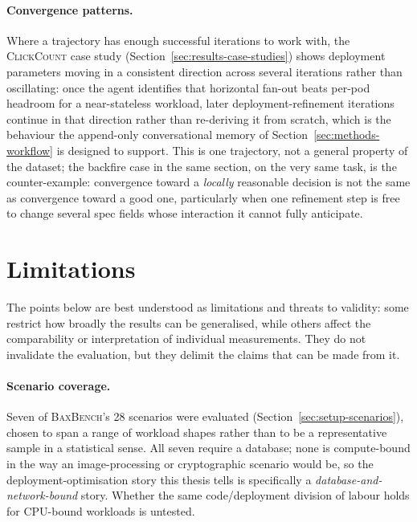 \paragraph{Convergence patterns.} Where a trajectory has enough successful
iterations to work with, the \textsc{ClickCount} case study
(Section~\ref{sec:results-case-studies}) shows deployment parameters
moving in a consistent direction across several iterations rather than
oscillating: once the agent identifies that horizontal fan-out beats
per-pod headroom for a near-stateless workload, later deployment-refinement iterations
continue in that direction rather than re-deriving it from scratch, which
is the behaviour the append-only conversational memory of
Section~\ref{sec:methods-workflow} is designed to support. This is one
trajectory, not a general property of the dataset; the backfire case in
the same section, on the very same task, is the counter-example:
convergence toward a \emph{locally} reasonable decision is not the same
as convergence toward a good one, particularly when one refinement step
is free to change several spec fields whose interaction it cannot fully
anticipate.


\section{Limitations}
\label{sec:discussion-limitations}

The points below are best understood as limitations and threats to validity:
some restrict how broadly the results can be generalised, while others affect
the comparability or interpretation of individual measurements. They do not
invalidate the evaluation, but they delimit the claims that can be made from
it.

\paragraph{Scenario coverage.} Seven of \textsc{BaxBench}'s 28 scenarios
were evaluated (Section~\ref{sec:setup-scenarios}), chosen to span a range
of workload shapes rather than to be a representative sample in a
statistical sense. All seven require a database; none is compute-bound in
the way an image-processing or cryptographic scenario would be, so the
deployment-optimisation story this thesis tells is specifically a
\emph{database-and-network-bound} story. Whether the same code/deployment
division of labour holds for CPU-bound workloads is untested.

